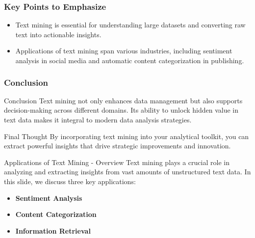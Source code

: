 \documentclass[aspectratio=169]{beamer}
\begin{document}
\begin{frame}[fragile]
    \frametitle{Key Points to Emphasize}
    \begin{itemize}
        \item Text mining is essential for understanding large datasets and converting raw text into actionable insights.
        \item Applications of text mining span various industries, including sentiment analysis in social media and automatic content categorization in publishing.
    \end{itemize}
\end{frame}

\begin{frame}[fragile]
    \frametitle{Conclusion}
    \begin{block}{Conclusion}
        Text mining not only enhances data management but also supports decision-making across different domains. Its ability to unlock hidden value in text data makes it integral to modern data analysis strategies.
    \end{block}
    \begin{block}{Final Thought}
        By incorporating text mining into your analytical toolkit, you can extract powerful insights that drive strategic improvements and innovation.
    \end{block}
\end{frame}

\begin{frame}[fragile]{Applications of Text Mining - Overview}
    Text mining plays a crucial role in analyzing and extracting insights from vast amounts of unstructured text data. In this slide, we discuss three key applications:
    \begin{itemize}
        \item \textbf{Sentiment Analysis}
        \item \textbf{Content Categorization}
        \item \textbf{Information Retrieval}
    \end{itemize}
\end{frame}
\end{document}
